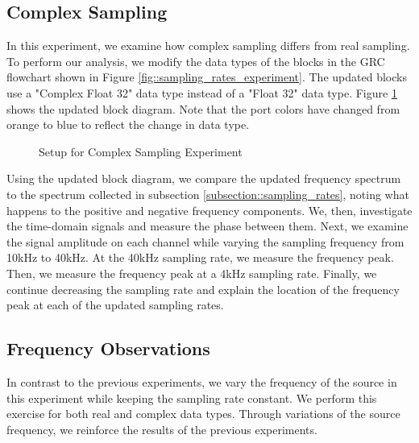 \documentclass{article}
\begin{document}
\subsection{Complex Sampling \label{subsection::complex_sampling}}

In this experiment, we examine how complex sampling differs from real sampling. To perform our analysis, we modify the data types of the blocks in the GRC flowchart shown in Figure \ref{fig::sampling_rates_experiment}. The updated blocks use a "Complex Float 32" data type instead of a "Float 32" data type. Figure \ref{fig::complex_sampling_experiment} shows the updated block diagram. Note that the port colors have changed from orange to blue to reflect the change in data type.

\begin{figure}[H]
	\centerline{}
	\caption{Setup for Complex Sampling Experiment}
	\label{fig::complex_sampling_experiment}
\end{figure}

Using the updated block diagram, we compare the updated frequency spectrum to the spectrum collected in subsection \ref{subsection::sampling_rates}, noting what happens to the positive and negative frequency components. We, then, investigate the time-domain signals and measure the phase between them. Next, we examine the signal amplitude on each channel while varying the sampling frequency from 10kHz to 40kHz. At the 40kHz sampling rate, we measure the frequency peak. Then, we measure the frequency peak at a 4kHz sampling rate. Finally, we continue decreasing the sampling rate and explain the location of the frequency peak at each of the updated sampling rates.

\subsection{Frequency Observations}

In contrast to the previous experiments, we vary the frequency of the source in this experiment while keeping the sampling rate constant. We perform this exercise for both real and complex data types. Through variations of the source frequency, we reinforce the results of the previous experiments.
\end{document}
